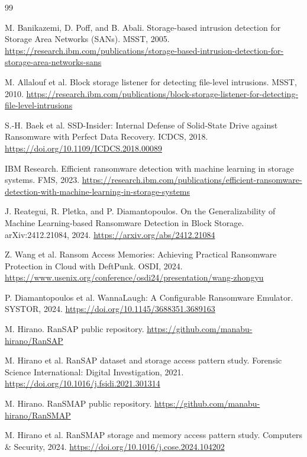 \begin{thebibliography}{99}

M. Banikazemi, D. Poff, and B. Abali.
Storage-based intrusion detection for Storage Area Networks (SANs).
MSST, 2005.
\url{https://research.ibm.com/publications/storage-based-intrusion-detection-for-storage-area-networks-sans}

M. Allalouf et al.
Block storage listener for detecting file-level intrusions.
MSST, 2010.
\url{https://research.ibm.com/publications/block-storage-listener-for-detecting-file-level-intrusions}

S.-H. Baek et al.
SSD-Insider: Internal Defense of Solid-State Drive against Ransomware with Perfect Data Recovery.
ICDCS, 2018.
\url{https://doi.org/10.1109/ICDCS.2018.00089}

IBM Research.
Efficient ransomware detection with machine learning in storage systems.
FMS, 2023.
\url{https://research.ibm.com/publications/efficient-ransomware-detection-with-machine-learning-in-storage-systems}

J. Reategui, R. Pletka, and P. Diamantopoulos.
On the Generalizability of Machine Learning-based Ransomware Detection in Block Storage.
arXiv:2412.21084, 2024.
\url{https://arxiv.org/abs/2412.21084}

Z. Wang et al.
Ransom Access Memories: Achieving Practical Ransomware Protection in Cloud with DeftPunk.
OSDI, 2024.
\url{https://www.usenix.org/conference/osdi24/presentation/wang-zhongyu}

P. Diamantopoulos et al.
WannaLaugh: A Configurable Ransomware Emulator.
SYSTOR, 2024.
\url{https://doi.org/10.1145/3688351.3689163}

M. Hirano.
RanSAP public repository.
\url{https://github.com/manabu-hirano/RanSAP}

M. Hirano et al.
RanSAP dataset and storage access pattern study.
Forensic Science International: Digital Investigation, 2021.
\url{https://doi.org/10.1016/j.fsidi.2021.301314}

M. Hirano.
RanSMAP public repository.
\url{https://github.com/manabu-hirano/RanSMAP}

M. Hirano et al.
RanSMAP storage and memory access pattern study.
Computers \& Security, 2024.
\url{https://doi.org/10.1016/j.cose.2024.104202}


\end{thebibliography}
